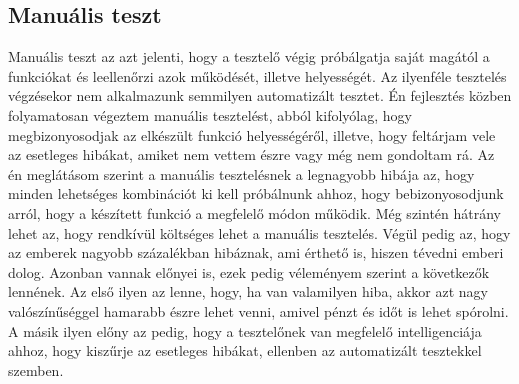 \documentclass[]{thesis-ekf}
\theoremstyle{definition}
\theoremstyle{remark}
\begin{document}
	\subsection{Manuális teszt}
		Manuális teszt az azt jelenti, hogy a tesztelő végig próbálgatja saját magától a funkciókat és leellenőrzi azok működését, illetve helyességét. Az ilyenféle tesztelés végzésekor nem alkalmazunk semmilyen automatizált tesztet. Én fejlesztés közben folyamatosan végeztem manuális tesztelést, abból kifolyólag, hogy megbizonyosodjak az elkészült funkció helyességéről, illetve, hogy feltárjam vele az esetleges hibákat, amiket nem vettem észre vagy még nem gondoltam rá. Az én meglátásom szerint a manuális tesztelésnek a legnagyobb hibája az, hogy minden lehetséges kombinációt ki kell próbálnunk ahhoz, hogy bebizonyosodjunk arról, hogy a készített funkció a megfelelő módon működik. Még szintén hátrány lehet az, hogy rendkívül költséges lehet a manuális tesztelés. Végül pedig az, hogy az emberek nagyobb százalékban hibáznak, ami érthető is, hiszen tévedni emberi dolog. Azonban vannak előnyei is, ezek pedig véleményem szerint a következők lennének. Az első ilyen az lenne, hogy, ha van valamilyen hiba, akkor azt nagy valószínűséggel hamarabb észre lehet venni, amivel pénzt és időt is lehet spórolni. A másik ilyen előny az pedig, hogy a tesztelőnek van megfelelő intelligenciája ahhoz, hogy kiszűrje az esetleges hibákat, ellenben az automatizált tesztekkel szemben. 
		
\end{document}
